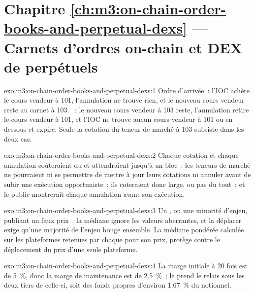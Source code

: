 \section*{Chapitre \ref{ch:m3:on-chain-order-books-and-perpetual-dexs} --- Carnets d'ordres on-chain et DEX de perpétuels}

\begin{solution}{exo:m3:on-chain-order-books-and-perpetual-dexs:1}
Ordre d'arrivée~: l'IOC achète le cours vendeur à 101, l'annulation ne trouve rien, et le nouveau cours vendeur reste au carnet à 103. ~: le nouveau cours vendeur à 103 reste, l'annulation
retire le cours vendeur à 101, et l'IOC ne trouve aucun cours vendeur à 101 ou en dessous et expire. Seule la cotation du teneur de marché à 103 subsiste dans les deux cas.
\end{solution}

\begin{solution}{exo:m3:on-chain-order-books-and-perpetual-dexs:2}
Chaque cotation et chaque annulation coûteraient du  et attendraient jusqu'à un bloc~: les teneurs de marché ne pourraient ni se permettre de mettre à jour leurs cotations ni annuler avant de subir
une exécution opportuniste~; ils coteraient donc large, ou pas du tout~; et le  public montrerait chaque annulation avant son exécution.
\end{solution}

\begin{solution}{exo:m3:on-chain-order-books-and-perpetual-dexs:3}
Un , ou une minorité d'enjeu, publiant un faux prix~: la médiane ignore les valeurs aberrantes, et la déplacer exige qu'une majorité de l'enjeu bouge ensemble. La médiane pondérée
calculée sur les plateformes retenues par chaque  pour son prix, protège contre le déplacement du prix d'une seule plateforme.
\end{solution}

\begin{solution}{exo:m3:on-chain-order-books-and-perpetual-dexs:4}
La marge initiale à 20 fois est de 5~\%, donc la marge de maintenance est de 2.5~\%~; le  prend le relais sous les deux tiers de celle-ci, soit des fonds propres d'environ 1.67~\% du notionnel.
\end{solution}

